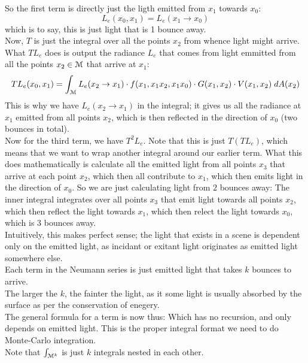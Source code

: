\documentclass[12pt]{article}
\begin{document}
So the first term is directly
just the ligth emitted from $x_1$
towards $x_0$:
\[ L_e(x_0, x_1) = L_e(x_1 \to x_0) \]
which is to say, this is just
light that is 1 bounce away. \\
Now, $T$ is just the integral
over all the points $x_2$
from whence light might arrive.
What $TL_e$ does is output
the radiance $L_e$ that comes from
light emmitted from all the points $x_2 \in \mathcal{M}$
that arrive at $x_1$:
\[ TL_e (x_0, x_1) = \int_{\mathcal{M}} L_e(x_2 \to x_1)
\cdot f(x_1, x_1x_2, x_1x_0) \cdot G(x_1, x_2)
\cdot V(x_1, x_2) \; dA(x_2) \]
This is why we have $L_e(x_2 \to x_1)$
in the integral; it gives us all the radiance
at $x_1$ emitted from all points $x_2$,
which is then reflected in the direction of $x_0$
(two bounces in total). \\
Now for the third term, we have
$T^2L_e$. Note that this is just
$T(TL_e)$,
which means that we want to wrap another
integral around our earlier term.
What this does mathematically is calculate
all the emitted light from all points $x_3$
that arrive at each point $x_2$,
which then all contribute to $x_1$,
which then emits light in the direction of $x_0$.
So we are just calculating light from $2$
bounces away:
The inner integral integrates over
all points $x_3$ that emit light
towards all points $x_2$,
which then reflect the light towards $x_1$,
which then relect the light towards $x_0$,
which is 3 bounces away. \\

Intuitively, this makes perfect sense;
the light that exists in a scene is
dependent only on the emitted light, as
incidant or exitant light originates 
as emitted light somewhere else. \\
Each term in the Neumann series is just
emitted light that takes $k$ bounces to arrive. \\
The larger the $k$, the fainter the light,
as it some light is usually absorbed
by the surface as per the conservation
of enegery. \\

The general formula for a term is now thus:
Which has no recursion, and only
depends on emitted light.
This is the proper integral format we need
to do Monte-Carlo integration. \\
Note that $\int_{\mathcal{M}^k}$
is just $k$ integrals nested in each other. \\
\end{document}
